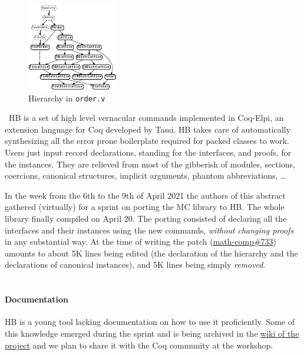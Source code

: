 \documentclass{easychair}
\def\MC{{\sf MC}}
\def\HB{{\sf HB}}
\begin{document}
\begin{figure}
  \vspace{-1em}
	\includegraphics[width=.35\textwidth]{order.pdf}
  \caption{\small Hierarchy in {\tt order.v}}
	\label{fig:order}

\end{figure}
\
\HB{} is a set of high level vernacular commands implemented in Coq-Elpi, an
extension language for Coq developed by Tassi. \HB{} takes
care of automatically synthesizing all the error prone boilerplate required for
packed classes to work. Users just input record declarations,
standing for the interfaces, and proofs, for the instances.
They are relieved from
most of the gibberish of modules, sections, coercions, canonical
structures, implicit arguments, phantom abbreviations, \ldots

In the week from the 6th to the 9th of April 2021 the authors of this abstract
gathered (virtually) for a sprint on porting the \MC{} library to
\HB{}. The whole library finally compiled on April 20.
The porting consisted of declaring all the interfaces and their instances
using the new commands, \emph{without changing proofs} in any substantial way.
At the time of writing the patch (\href{https://github.com/math-comp/math-comp/pull/733}{math-comp\#733})
amounts to about 5K lines being edited (the declaration of the hierarchy and
the declarations of canonical instances), and 5K lines being simply \emph{removed}.\\
\
\paragraph{Documentation}
\HB{} is a young tool lacking documentation
on how to use it proficiently. Some of this knowledge emerged
during the sprint and is being archived in the
\href{https://github.com/math-comp/hierarchy-builder/wiki}{wiki of the project}
and we plan to share it with the Coq community at the workshop.
\end{document}
